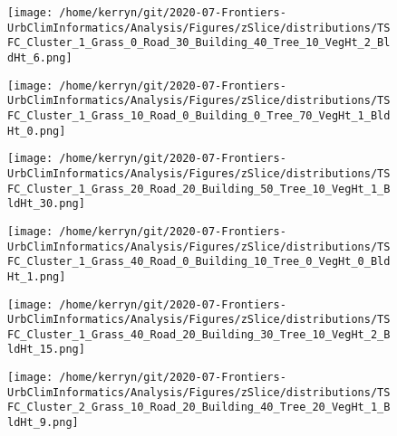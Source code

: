 \documentclass{article}
\begin{document}
\begin{figure}
\centering    
\texttt{[image: /home/kerryn/git/2020-07-Frontiers-UrbClimInformatics/Analysis/Figures/zSlice/distributions/TSFC\_Cluster\_1\_Grass\_0\_Road\_30\_Building\_40\_Tree\_10\_VegHt\_2\_BldHt\_6.png]}
\end{figure} 
\clearpage

\begin{figure}
\centering    
\texttt{[image: /home/kerryn/git/2020-07-Frontiers-UrbClimInformatics/Analysis/Figures/zSlice/distributions/TSFC\_Cluster\_1\_Grass\_10\_Road\_0\_Building\_0\_Tree\_70\_VegHt\_1\_BldHt\_0.png]}
\end{figure} 
\clearpage

\begin{figure}
\centering    
\texttt{[image: /home/kerryn/git/2020-07-Frontiers-UrbClimInformatics/Analysis/Figures/zSlice/distributions/TSFC\_Cluster\_1\_Grass\_20\_Road\_20\_Building\_50\_Tree\_10\_VegHt\_1\_BldHt\_30.png]}
\end{figure} 
\clearpage

\begin{figure}
\centering    
\texttt{[image: /home/kerryn/git/2020-07-Frontiers-UrbClimInformatics/Analysis/Figures/zSlice/distributions/TSFC\_Cluster\_1\_Grass\_40\_Road\_0\_Building\_10\_Tree\_0\_VegHt\_0\_BldHt\_1.png]}
\end{figure} 
\clearpage

\begin{figure}
\centering    
\texttt{[image: /home/kerryn/git/2020-07-Frontiers-UrbClimInformatics/Analysis/Figures/zSlice/distributions/TSFC\_Cluster\_1\_Grass\_40\_Road\_20\_Building\_30\_Tree\_10\_VegHt\_2\_BldHt\_15.png]}
\end{figure} 
\clearpage

\begin{figure}
\centering    
\texttt{[image: /home/kerryn/git/2020-07-Frontiers-UrbClimInformatics/Analysis/Figures/zSlice/distributions/TSFC\_Cluster\_2\_Grass\_10\_Road\_20\_Building\_40\_Tree\_20\_VegHt\_1\_BldHt\_9.png]}
\end{figure} 
\clearpage
\end{document}

